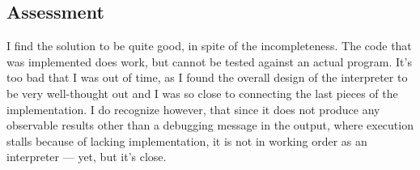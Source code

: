 %
%

\subsection{Assessment}
I find the solution to be quite good, in spite of the incompleteness. The code
that was implemented does work, but cannot be tested against an actual
program. It's too bad that I was out of time, as I found the overall design of
the interpreter to be very well-thought out and I was so close to connecting
the last pieces of the implementation. I do recognize however, that since it
does not produce any observable results other than a debugging message in the
output, where execution stalls because of lacking implementation, it is not in
working order as an interpreter --- yet, but it's close.
